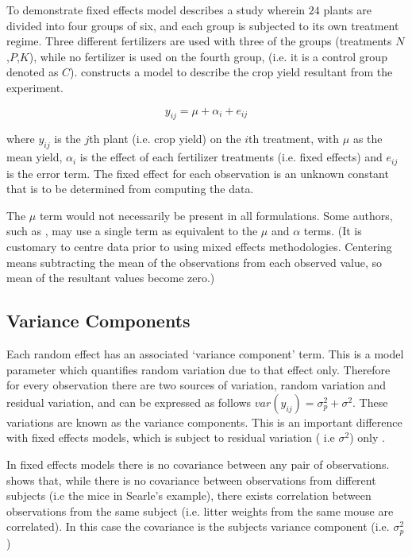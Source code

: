\documentclass[12pt, a4paper]{report}
\theoremstyle{plain}
\theoremstyle{definition}
\theoremstyle{remark}
\begin{document}
To demonstrate fixed effects model \citet{Searle} describes a
study wherein $24$ plants are divided into four groups of six, and
each group is subjected to its own treatment regime. Three
different fertilizers are used with three of the groups
(treatments $N$,$P$,$K$), while no fertilizer is used on the
fourth group, (i.e. it is a control group denoted as $C$).
\citet{Searle} constructs a model to describe the crop yield
resultant from the experiment.

\begin{equation}
y_{ij} = \mu + \alpha_{i} + e_{ij}
\end{equation}

where $y_{ij}$ is the $j$th plant (i.e. crop yield) on the $i$th
treatment, with $\mu$ as the mean yield, $\alpha_{i}$ is the
effect of each fertilizer treatments (i.e. fixed effects) and
$e_{ij}$ is the error term. The fixed effect for each observation
is an unknown constant that is to be determined from computing the
data.

The $\mu$ term would not
necessarily be present in all formulations. Some authors, such as
\citet{Demi}, may use a single term as equivalent to the $\mu$ and
$\alpha$ terms. (It is customary to centre data prior to using
mixed effects methodologies. Centering means subtracting the mean
of the observations from each observed value, so mean of the
resultant values become zero.)

\subsection{Variance Components}
Each random effect has an associated `variance component' term.
This is a model parameter which quantifies random variation due to
that effect only. Therefore for every observation there are two
sources of variation, random variation and residual variation, and
can be expressed as follows $var(y_{ij})=\sigma^{2}_{p} +
\sigma^{2}$. These variations are known as the variance
components. This is an important difference with fixed effects
models, which is subject to residual variation ( i.e $\sigma^{2}$)
only \citep{BrownPrescott}.

In fixed effects models there is no covariance between any pair of
observations. \citet*{BrownPrescott} shows that, while there is no
covariance between observations from different subjects (i.e the
mice in Searle's example), there exists correlation between
observations from the same subject (i.e. litter weights from the
same mouse are correlated). In this case the covariance is the
subjects variance component (i.e. $\sigma^{2}_{p}$)
\end{document}
